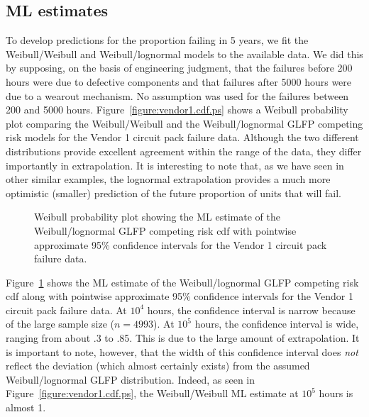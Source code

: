 \subsection{ML estimates}
To develop predictions for the proportion failing in 5 years, we fit
the Weibull/Weibull and Weibull/lognormal models to the available
data. We did this by supposing, on the basis of engineering
judgment, that the failures before 200 hours were due to defective
components and that failures after 5000 hours were due to a wearout
mechanism. No assumption was used for the failures between 200 and
5000 hours.  Figure~\ref{figure:vendor1.cdf.ps} shows a Weibull
probability plot comparing the Weibull/Weibull and the
Weibull/lognormal GLFP competing risk models for the Vendor 1
circuit pack failure data.  Although the two different distributions
provide excellent agreement within the range of the data, they
differ importantly in extrapolation.  It is interesting to note
that, as we have seen in other similar examples, the lognormal
extrapolation provides a much more optimistic (smaller) prediction
of the future proportion of units that will fail.
\begin{figure}
\caption{Weibull probability plot showing the ML estimate
of the Weibull/lognormal GLFP competing risk cdf with pointwise
approximate 95\% confidence intervals for the Vendor 1 circuit pack
failure data.}
\label{figure:vendor1.lognor.cdf.ci.ps}
\end{figure}
Figure~\ref{figure:vendor1.lognor.cdf.ci.ps} shows the ML estimate
of the Weibull/lognormal GLFP competing risk cdf along with
pointwise approximate 95\% confidence intervals for the Vendor 1
circuit pack failure data.  At $10^{4}$ hours, the confidence
interval is narrow because of the large sample size ($n=4993$). At
$10^{5}$ hours, the confidence interval is wide, ranging from about
.3 to .85. This is due to the large amount of extrapolation. It is
important to note, however, that the width of this confidence
interval does {\em not} reflect the deviation (which almost
certainly exists) from the assumed Weibull/lognormal
GLFP distribution. Indeed, as seen in Figure~\ref{figure:vendor1.cdf.ps},
the Weibull/Weibull ML estimate at $10^{5}$ hours is almost 1.

